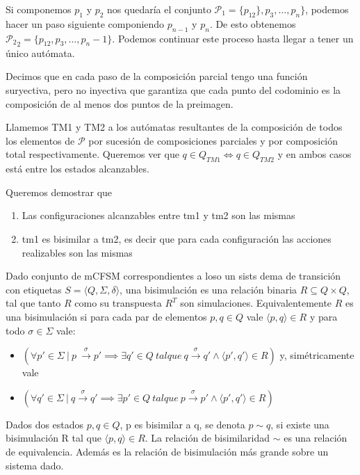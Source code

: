 Si componemos $p_1$ y $p_2$ nos quedaría el conjunto $\mathcal{P}_1 =\{ p_{12} \}, p_3, \ldots, p_n \} $, podemos hacer un paso siguiente componiendo $p_{n-1}$ y $p_n$. De esto obtenemos $\mathcal{P_2}_2= \{ p_{12}, p_3, \ldots, p_n-1 \} $. Podemos continuar este proceso hasta llegar a tener un único autómata. %

Decimos que en cada paso de la composición parcial tengo una función suryectiva, pero no inyectiva que garantiza que cada punto del codominio es la composición de al menos dos puntos de la preimagen.

Llamemos TM1 y TM2 a los autómatas resultantes de la composición de todos los elementos de $\mathcal{P}$ por sucesión de composiciones parciales y por composición total respectivamente. Queremos ver que $ q \in Q_{TM1} \iff q \in Q_{TM2} $ y en ambos casos está entre los estados alcanzables. 

Queremos demostrar que
\begin{enumerate}
\item Las configuraciones alcanzables entre tm1 y tm2 son las mismas
\item tm1 es bisimilar a tm2, es decir que para cada configuración las acciones realizables son las mismas
\end{enumerate}

\begin{definition}[Bisimulación]
Dado conjunto de mCFSM correspondientes a loso un sists dema de transición con etiquetas $ S =\langle Q, \Sigma, \delta \rangle $, una bisimulación es una relación binaria $R \subseteq Q \times Q$, tal que tanto $R$ como su transpuesta $R^T$ son simulaciones. Equivalentemente $R$ es una bisimulación si para cada par de elementos $p, q \in Q$ vale $\langle p, q \rangle \in R$ y para todo $\sigma \in \Sigma $ vale:
\begin{itemize}
    \item $(\forall p' \in \Sigma \  | \  p \ \overset{\sigma}{\rightarrow} p' \implies \exists q'\in Q \ \mathit{tal que} \ q \overset{\sigma}{\rightarrow} q' \land \langle p', q' \rangle \in R )$ y, simétricamente vale 
    \item $(\forall q' \in \Sigma \  | \  q \overset{\sigma}{\rightarrow} q' \implies \exists p'\in Q \ \mathit{tal que} \ p \overset{\sigma}{\rightarrow} p' \land \langle p', q' \rangle \in R ) $
\end{itemize}

Dados dos estados $p, q \in Q $, p es bisimilar a q, se denota $p \sim q $, si existe una bisimulación R tal que $\langle p,q \rangle \in R$. La relación de bisimilaridad $\sim$ es una relación de equivalencia. Además es la relación de bisimulación más grande sobre un sistema dado.

\end{definition}
